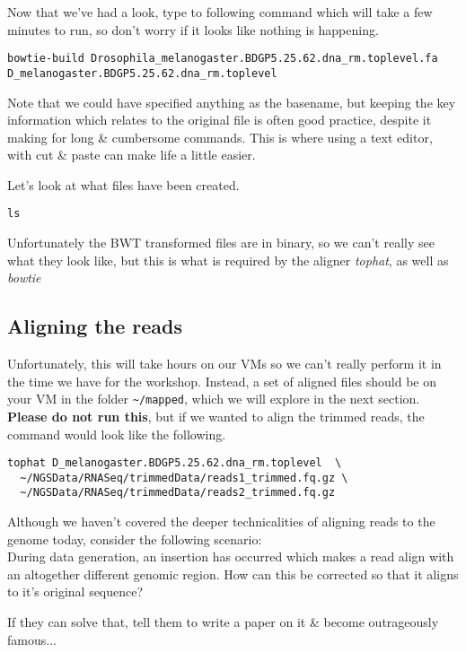\begin{steps}
Now that we've had a look, type to following command which will take a few minutes to run, so don't worry if it looks like nothing is happening.
\begin{lstlisting}
bowtie-build Drosophila_melanogaster.BDGP5.25.62.dna_rm.toplevel.fa D_melanogaster.BDGP5.25.62.dna_rm.toplevel
\end{lstlisting}
Note that we could have specified anything as the basename, but keeping the key information which relates to the original file is often good practice, despite it making for long \& cumbersome commands.
This is where using a text editor, with cut \& paste can make life a little easier.
\end{steps}

\begin{steps}
Let's look at what files have been created.
\begin{lstlisting}
ls
\end{lstlisting}
Unfortunately the BWT transformed files are in binary, so we can't really see what they look like, but this is what is required by the aligner \textit{tophat}, as well as \textit{bowtie} 
\end{steps}

\subsection{Aligning the reads}
Unfortunately, this will take hours on our VMs so we can't really perform it in the time we have for the workshop.
Instead, a set of aligned files should be on your VM in the folder \texttt{\~{}/mapped}, which we will explore in the next section.
\textbf{Please do not run this}, but if we wanted to align the trimmed reads, the command would look like the following.
\begin{lstlisting}
tophat D_melanogaster.BDGP5.25.62.dna_rm.toplevel  \
  ~/NGSData/RNASeq/trimmedData/reads1_trimmed.fq.gz \
  ~/NGSData/RNASeq/trimmedData/reads2_trimmed.fq.gz
\end{lstlisting}

\begin{advanced}
\begin{questions}
Although we haven't covered the deeper technicalities of aligning reads to the genome today, consider the following scenario:\\

During data generation, an insertion has occurred which makes a read align with an altogether different genomic region.
How can this be corrected so that it aligns to it's original sequence? \\
\begin{answer}
If they can solve that, tell them to write a paper on it \& become outrageously famous...
\end{answer}
\end{questions}
\end{advanced}